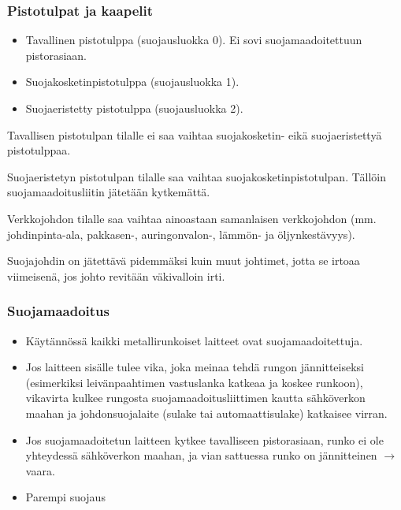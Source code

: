 \begin{frame}
\frametitle{Pistotulpat ja kaapelit} %
\begin{itemize}
\item Tavallinen pistotulppa (suojausluokka 0). Ei sovi suojamaadoitettuun pistorasiaan.
\item Suojakosketinpistotulppa (suojausluokka 1).
\item Suojaeristetty pistotulppa (suojausluokka 2).
\end{itemize}

Tavallisen pistotulpan tilalle ei saa vaihtaa suojakosketin- eikä suojaeristettyä pistotulppaa.

Suojaeristetyn pistotulpan tilalle saa vaihtaa suojakosketinpistotulpan. Tällöin suojamaadoitusliitin jätetään kytkemättä.

Verkkojohdon tilalle saa vaihtaa ainoastaan samanlaisen verkkojohdon (mm. johdinpinta-ala, pakkasen-, auringonvalon-, lämmön- ja öljynkestävyys). 

Suojajohdin on jätettävä pidemmäksi kuin muut johtimet, jotta se irtoaa viimeisenä, jos johto revitään väkivalloin irti.

\end{frame}

\begin{frame}
\frametitle{Suojamaadoitus}
\begin{itemize}
\item Käytännössä kaikki metallirunkoiset laitteet ovat suojamaadoitettuja.
\item Jos laitteen sisälle tulee vika, joka meinaa tehdä rungon jännitteiseksi (esimerkiksi leivänpaahtimen vastuslanka katkeaa ja koskee runkoon), vikavirta kulkee rungosta suojamaadoitusliittimen kautta
sähköverkon maahan ja johdonsuojalaite (sulake tai automaattisulake) katkaisee virran.
\item Jos suojamaadoitetun laitteen kytkee tavalliseen pistorasiaan, runko ei ole yhteydessä sähköverkon maahan, ja vian sattuessa runko on jännitteinen $\to$ vaara.
\item Parempi suojaus 
\end{itemize}
\end{frame}


